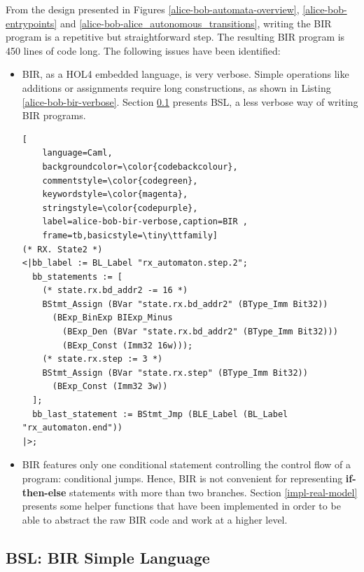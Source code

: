 \documentclass{kththesis}
\begin{document}
{From the design presented in Figures \ref{alice-bob-automata-overview}, \ref{alice-bob-entrypoints} and \ref{alice-bob-alice_autonomous_transitions}, writing the BIR program is a repetitive but straightforward step. The resulting BIR program is \num{450} lines of code long. The following issues have been identified:

\begin{itemize}
    \item BIR, as a HOL4 embedded language, is very verbose. Simple operations like additions or assignments require long constructions, as shown in Listing \ref{alice-bob-bir-verbose}. Section \ref{bsl} presents BSL, a less verbose way of writing BIR programs.
\begin{lstlisting}[
    language=Caml,
    backgroundcolor=\color{codebackcolour},
    commentstyle=\color{codegreen},
    keywordstyle=\color{magenta},
    stringstyle=\color{codepurple},
    label=alice-bob-bir-verbose,caption=BIR ,
    frame=tb,basicstyle=\tiny\ttfamily]
(* RX. State2 *)
<|bb_label := BL_Label "rx_automaton.step.2";
  bb_statements := [
    (* state.rx.bd_addr2 -= 16 *)
    BStmt_Assign (BVar "state.rx.bd_addr2" (BType_Imm Bit32))
      (BExp_BinExp BIExp_Minus
        (BExp_Den (BVar "state.rx.bd_addr2" (BType_Imm Bit32)))
        (BExp_Const (Imm32 16w)));
    (* state.rx.step := 3 *)
    BStmt_Assign (BVar "state.rx.step" (BType_Imm Bit32))
      (BExp_Const (Imm32 3w))
  ];
  bb_last_statement := BStmt_Jmp (BLE_Label (BL_Label "rx_automaton.end"))
|>;
\end{lstlisting}
    \item BIR features only one conditional statement controlling the control flow of a program: conditional jumps. Hence, BIR is not convenient for representing \textbf{if-then-else} statements with more than two branches. Section \ref{impl-real-model} presents some helper functions that have been implemented in order to be able to abstract the raw BIR code and work at a higher level.
\end{itemize}

\subsection{BSL: BIR Simple Language} \label{bsl}

}
\end{document}
